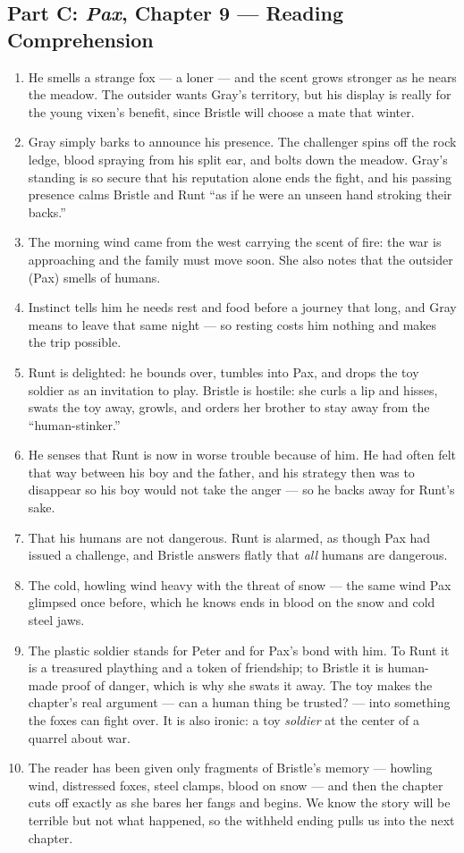 \documentclass[11pt]{article}
\begin{document}
\subsection*{Part C: \textit{Pax}, Chapter 9 --- Reading Comprehension}
\begin{enumerate}[start=21]
  \item He smells a strange fox --- a loner --- and the scent grows stronger as he nears the meadow. The outsider wants Gray's territory, but his display is really for the young vixen's benefit, since Bristle will choose a mate that winter.
  \item Gray simply barks to announce his presence. The challenger spins off the rock ledge, blood spraying from his split ear, and bolts down the meadow. Gray's standing is so secure that his reputation alone ends the fight, and his passing presence calms Bristle and Runt ``as if he were an unseen hand stroking their backs.''
  \item The morning wind came from the west carrying the scent of fire: the war is approaching and the family must move soon. She also notes that the outsider (Pax) smells of humans.
  \item Instinct tells him he needs rest and food before a journey that long, and Gray means to leave that same night --- so resting costs him nothing and makes the trip possible.
  \item Runt is delighted: he bounds over, tumbles into Pax, and drops the toy soldier as an invitation to play. Bristle is hostile: she curls a lip and hisses, swats the toy away, growls, and orders her brother to stay away from the ``human-stinker.''
  \item He senses that Runt is now in worse trouble because of him. He had often felt that way between his boy and the father, and his strategy then was to disappear so his boy would not take the anger --- so he backs away for Runt's sake.
  \item That his humans are not dangerous. Runt is alarmed, as though Pax had issued a challenge, and Bristle answers flatly that \emph{all} humans are dangerous.
  \item The cold, howling wind heavy with the threat of snow --- the same wind Pax glimpsed once before, which he knows ends in blood on the snow and cold steel jaws.
  \item The plastic soldier stands for Peter and for Pax's bond with him. To Runt it is a treasured plaything and a token of friendship; to Bristle it is human-made proof of danger, which is why she swats it away. The toy makes the chapter's real argument --- can a human thing be trusted? --- into something the foxes can fight over. It is also ironic: a toy \emph{soldier} at the center of a quarrel about war.
  \item The reader has been given only fragments of Bristle's memory --- howling wind, distressed foxes, steel clamps, blood on snow --- and then the chapter cuts off exactly as she bares her fangs and begins. We know the story will be terrible but not what happened, so the withheld ending pulls us into the next chapter.
\end{enumerate}
\end{document}
